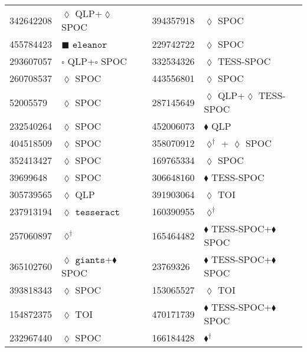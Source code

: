 \begin{longtable}{llrllr}
342642208 & $\lozenge$ QLP+$\lozenge$ SPOC & \cite{TIC_393831507} & 394357918 & $\lozenge$ SPOC & \cite{TIC_441738827} \\
455784423 & $\blacksquare$ $\texttt{eleanor}$ & \cite{TIC_155867025} & 229742722 & $\lozenge$ SPOC & \cite{TIC_229742722} \\
293607057 & $\square$ QLP+$\square$ SPOC& \cite{TIC_293607057} & 332534326 & $\lozenge$ TESS-SPOC & \cite{TIC_332534326} \\
260708537 & $\lozenge$ SPOC & \cite{TIC_260708537} & 443556801 & $\lozenge$ SPOC & \cite{TIC_348755728} \\
52005579 & $\lozenge$ SPOC & \cite{TIC_52005579} & 287145649 & $\lozenge$ QLP+$\lozenge$ TESS-SPOC& \cite{TIC_332534326} \\
232540264 & $\lozenge$ SPOC & \cite{TIC_232540264} & 452006073 & $\blacklozenge$ QLP & \cite{TIC_439366538} \\
404518509 & $\lozenge$ SPOC & \cite{TIC_404518509} & 358070912 & $\lozenge^\dagger$ + $\lozenge$ SPOC & \cite{TIC_358070912} \\
352413427 & $\lozenge$ SPOC & \cite{TIC_232540264} & 169765334 & $\lozenge$ SPOC & \cite{TIC_232540264} \\
39699648 & $\lozenge$ SPOC & \cite{TIC_232540264} & 306648160 & $\blacklozenge$ TESS-SPOC & \cite{TIC_446549906} \\
305739565 & $\lozenge$ QLP & \cite{TIC_305739565} & 391903064 & $\lozenge$ TOI & \cite{TIC_154872375} \\
237913194 & $\lozenge$ $\texttt{tesseract}$ & \cite{TIC_237913194} & 160390955 & $\lozenge^\dagger$ & \cite{TIC_160390955} \\
257060897 & $\lozenge^\dagger$ & \cite{TIC_257060897} & 165464482 & $\blacklozenge$ TESS-SPOC+$\blacklozenge$ SPOC & \cite{TIC_446549906} \\
365102760 & $\lozenge$ $\texttt{giants}$+$\blacklozenge$ SPOC & \cite{TIC_365102760} & 23769326 & $\blacklozenge$ TESS-SPOC+$\blacklozenge$ SPOC & \cite{TIC_446549906} \\
393818343 & $\lozenge$ SPOC & \cite{TIC_393818343} & 153065527 & $\lozenge$ TOI & \cite{TIC_154872375} \\
154872375 & $\lozenge$ TOI & \cite{TIC_154872375} & 470171739 & $\blacklozenge$ TESS-SPOC+$\blacklozenge$ SPOC & \cite{TIC_446549906} \\
232967440 & $\lozenge$ SPOC & \cite{TIC_232967440} & 166184428 & $\blacklozenge^\dagger$ & \cite{TIC_166184428} \\

\end{longtable}
